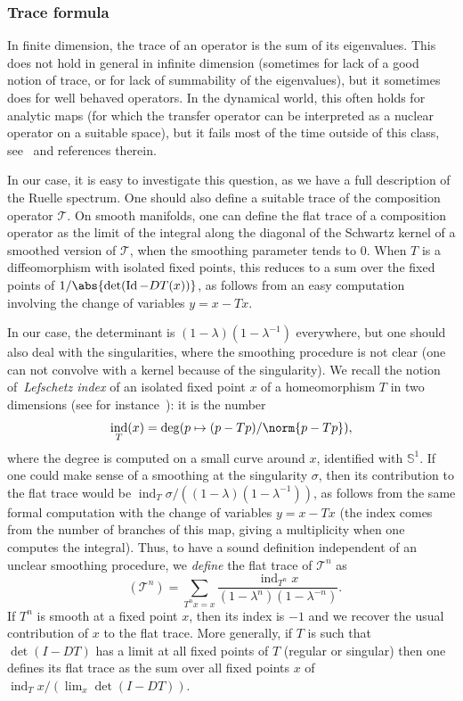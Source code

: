 \documentclass[10pt]{amsart}
\newcommand{\boT}{\mathcal{T}}
\newcommand{\Sbb}{\mathbb{S}}
\DeclareMathOperator{\ind}{ind}
\DeclareMathOperator{\Id}{Id}
\DeclareMathOperator{\flattr}{\mathrm{tr}^{\flat}}
\theoremstyle{definition}
\numberwithin{equation}{section}
\begin{document}
\subsubsection*{Trace formula}

In finite dimension, the trace of an operator is the sum of its eigenvalues.
This does not hold in general in infinite dimension (sometimes for lack of a
good notion of trace, or for lack of summability of the eigenvalues), but it
sometimes does for well behaved operators. In the dynamical world, this often
holds for analytic maps (for which the transfer operator can be interpreted
as a nuclear operator on a suitable space), but it fails most of the time
outside of this class, see~\cite{jezequel} and references therein.

In our case, it is easy to investigate this question, as we have a full
description of the Ruelle spectrum. One should also define a suitable trace
of the composition operator $\boT$. On smooth manifolds, one can define the
flat trace of a composition operator as the limit of the integral along the
diagonal of the Schwartz kernel of a smoothed version of $\boT$, when the
smoothing parameter tends to $0$. When $T$ is a diffeomorphism with isolated
fixed points, this reduces to a sum over the fixed points of
$1/{\abs{\det(\Id - DT(x))}}$, as follows from an easy computation involving
the change of variables $y = x - T x$.

In our case, the determinant is $(1-\lambda) (1-\lambda^{-1})$ everywhere,
but one should also deal with the singularities, where the smoothing
procedure is not clear (one can not convolve with a kernel because of the
singularity). We recall the notion of~\emph{Lefschetz index} of an isolated
fixed point $x$ of a homeomorphism $T$ in two dimensions (see for
instance~\cite[\S8.4]{katok}): it is the number
\begin{equation*}
\ind_T (x) = \deg (p \mapsto (p-T p)/\norm{p-T p}),
\end{equation*}
where the degree is computed on a small curve around $x$, identified with
$\Sbb^1$. If one could make sense of a smoothing at the singularity $\sigma$,
then its contribution to the flat trace would be $\ind_T \sigma/((1-\lambda)
(1-\lambda^{-1}))$, as follows from the same formal computation with the
change of variables $y = x- Tx$ (the index comes from the number of branches
of this map, giving a multiplicity when one computes the integral). Thus, to
have a sound definition independent of an unclear smoothing procedure, we
\emph{define} the flat trace of $\boT^n$ as
\begin{equation*}
\flattr(\boT^n) = \sum_{T^n x = x} \frac{ \ind_{T^n} x}{(1-\lambda^n) (1-\lambda^{-n})}.
\end{equation*}
If $T^n$ is smooth at a fixed point $x$, then its index is $-1$ and we
recover the usual contribution of $x$ to the flat trace. More generally, if
$T$ is such that $\det(I-DT)$ has a limit at all fixed points of $T$ (regular
or singular) then one defines its flat trace as the sum over all fixed points
$x$ of $\ind_T x/(\lim_x \det(I-DT))$.
\end{document}

